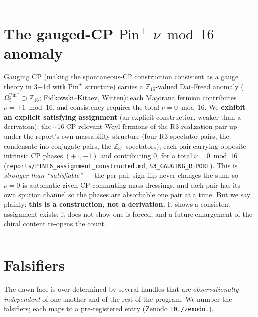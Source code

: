 \documentclass[aps,prd,preprint,nofootinbib,superscriptaddress]{revtex4-2}
\begin{document}
\begin{center}\rule{0.5\linewidth}{0.5pt}\end{center}

\section{\texorpdfstring{The gauged-CP \(\mathrm{Pin}^+\)
\(\nu \bmod 16\) anomaly}{The gauged-CP   anomaly}}\label{sec-8}

Gauging CP (making the spontaneous-CP construction consistent as a gauge
theory in 3+1d with \(\mathrm{Pin}^+\) structure) carries a
\(\mathbb{Z}_{16}\)-valued Dai--Freed anomaly
(\(\Omega^{\mathrm{Pin}^+}_5 \supset \mathbb{Z}_{16}\);
Fidkowski--Kitaev, Witten): each Majorana fermion contributes
\(\nu = \pm1 \bmod 16\), and consistency requires the total
\(\nu = 0 \bmod 16\). We \textbf{exhibit an explicit satisfying
assignment} (an explicit construction, weaker than a derivation): the
\textasciitilde16 CP-relevant Weyl fermions of the R3 realization pair
up under the report's own massability structure (four R3 spectator
pairs, the condensate-ino conjugate pairs, the \(\mathbb{Z}_{31}\)
spectators), each pair carrying opposite intrinsic CP phases
\((+1, -1)\) and contributing 0, for a total \(\nu = 0 \bmod 16\)
(\texttt{reports/\allowbreak PIN16\_\allowbreak assignment\_\allowbreak constructed.\allowbreak md},
\texttt{S3\_\allowbreak GAUGING\_\allowbreak REPORT}). This is \emph{stronger than
``satisfiable''} --- the per-pair sign flip never changes the sum, so
\(\nu = 0\) is automatic given CP-commuting mass dressings, and each
pair has its own spurion channel so the phases are absorbable one pair
at a time. But we say plainly: \textbf{this is a construction, not a
derivation.} It shows a consistent assignment exists; it does not show
one is forced, and a future enlargement of the chiral content re-opens
the count.

\begin{center}\rule{0.5\linewidth}{0.5pt}\end{center}

\section{Falsifiers}\label{sec-9}

The dawn face is over-determined by several handles that are
\emph{observationally independent} of one another and of the rest of the
program. We number the falsifiers; each maps to a pre-registered entry
(Zenodo \texttt{10./\allowbreak zenodo.}).
\end{document}
